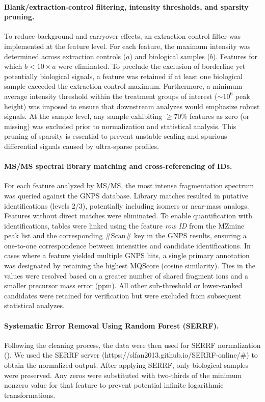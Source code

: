 \documentclass[9pt,twocolumn,twoside]{rilabRxiv}
\begin{document}
\paragraph{Blank/extraction-control filtering, intensity thresholds, and sparsity pruning.}
To reduce background and carryover effects, an extraction control filter was implemented at the feature level. For each feature, the maximum intensity was determined across extraction controls (\(a\)) and biological samples (\(b\)). Features for which \(b < 10\times a\) were eliminated. To preclude the exclusion of borderline yet potentially biological signals, a feature was retained if at least one biological sample exceeded the extraction control maximum. Furthermore, a minimum average intensity threshold within the treatment groups of interest (\(\sim 10^{6}\) peak height) was imposed to ensure that downstream analyzes would emphasize robust signals. At the sample level, any sample exhibiting \(\geq 70\%\) features as zero (or missing) was excluded prior to normalization and statistical analysis. This pruning of sparsity is essential to prevent unstable scaling and spurious differential signals caused by ultra-sparse profiles. 


\paragraph{MS/MS spectral library matching and cross-referencing of IDs.}
For each feature analyzed by MS/MS, the most intense fragmentation spectrum was queried against the GNPS database. Library matches resulted in putative identifications (levels 2/3), potentially including isomers or near-mass analogs. Features without direct matches were eliminated. To enable quantification with identifications, tables were linked using the feature \emph{row ID} from the MZmine peak list and the corresponding \#Scan\# key in the GNPS results, ensuring a one-to-one correspondence between intensities and candidate identifications. In cases where a feature yielded multiple GNPS hits, a single primary annotation was designated by retaining the highest MQScore (cosine similarity). Ties in the values were resolved based on a greater number of shared fragment ions and a smaller precursor mass error (ppm). All other sub-threshold or lower-ranked candidates were retained for verification but were excluded from subsequent statistical analyzes.

\paragraph{Systematic Error Removal Using Random Forest (SERRF).}
Following the cleaning process, the data were then used for SERRF normalization (\cite{Fan2019}). We used the SERRF server (https://slfan2013.github.io/SERRF-online/\#) to obtain the normalized output. After applying SERRF, only biological samples were preserved. Any zeros were substituted with two-thirds of the minimum nonzero value for that feature to prevent potential infinite logarithmic transformations.
\end{document}
